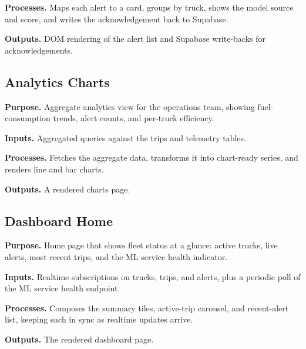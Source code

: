 \noindent\textbf{Processes.} Maps each alert to a card, groups by truck, shows the model source and score, and writes the acknowledgement back to Supabase.

\noindent\textbf{Outputs.} DOM rendering of the alert list and Supabase write-backs for acknowledgements.



\subsection{Analytics Charts}
\label{sec:code_frontend_analytics}

\noindent\textbf{Purpose.} Aggregate analytics view for the operations team, showing fuel-consumption trends, alert counts, and per-truck efficiency.

\noindent\textbf{Inputs.} Aggregated queries against the trips and telemetry tables.

\noindent\textbf{Processes.} Fetches the aggregate data, transforms it into chart-ready series, and renders line and bar charts.

\noindent\textbf{Outputs.} A rendered charts page.



\subsection{Dashboard Home}
\label{sec:code_frontend_dashboard}

\noindent\textbf{Purpose.} Home page that shows fleet status at a glance: active trucks, live alerts, most recent trips, and the ML service health indicator.

\noindent\textbf{Inputs.} Realtime subscriptions on trucks, trips, and alerts, plus a periodic poll of the ML service health endpoint.

\noindent\textbf{Processes.} Composes the summary tiles, active-trip carousel, and recent-alert list, keeping each in sync as realtime updates arrive.

\noindent\textbf{Outputs.} The rendered dashboard page.



